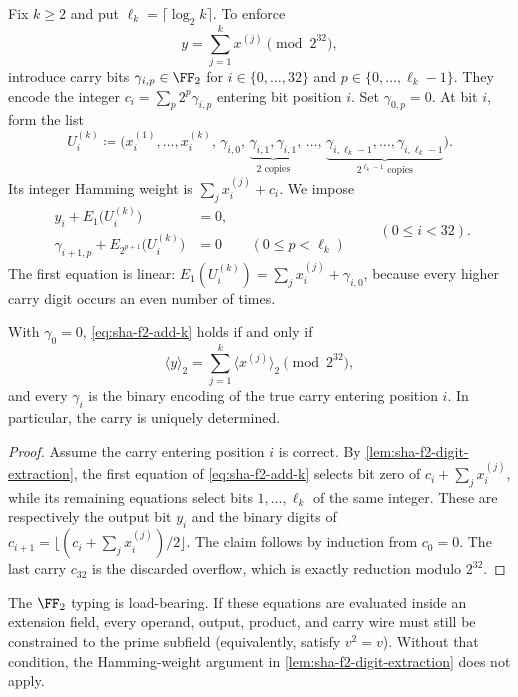Fix $k\geq2$ and put $\ell_k=\lceil\log_2 k\rceil$.  To enforce
\[
  y=\sum_{j=1}^k x^{(j)}\pmod{2^{32}},
\]
introduce carry bits
$\gamma_{i,p}\in\FF_2$ for
$i\in\{0,\ldots,32\}$ and $p\in\{0,\ldots,\ell_k-1\}$.
They encode the integer
$c_i=\sum_p2^p\gamma_{i,p}$ entering bit position $i$.  Set
$\gamma_{0,p}=0$.  At bit $i$, form the list
\begin{equation}\label{eq:sha-f2-carry-multiset}
  U_i^{(k)}
  \coloneqq
  \bigl(
    x^{(1)}_i,\ldots,x^{(k)}_i,\,
    \gamma_{i,0},\,
    \underbrace{\gamma_{i,1},\gamma_{i,1}}_{2\text{ copies}},\,
    \ldots,\,
    \underbrace{\gamma_{i,\ell_k-1},\ldots,
                \gamma_{i,\ell_k-1}}_{2^{\ell_k-1}\text{ copies}}
  \bigr).
\end{equation}
Its integer Hamming weight is
$\sum_jx_i^{(j)}+c_i$.  We impose
\begin{equation}\label{eq:sha-f2-add-k}
\boxed{
\begin{aligned}
 y_i+E_1\bigl(U_i^{(k)}\bigr)&=0,\\
 \gamma_{i+1,p}
   +E_{2^{p+1}}\bigl(U_i^{(k)}\bigr)&=0
       &&(0\leq p<\ell_k)
\end{aligned}}
\qquad(0\leq i<32).
\end{equation}
The first equation is linear:
$E_1(U_i^{(k)})=\sum_jx_i^{(j)}+\gamma_{i,0}$, because every
higher carry digit occurs an even number of times.

\begin{lemma}\label{lem:sha-f2-adder}
With $\gamma_0=0$, \eqref{eq:sha-f2-add-k} holds if and only if
\[
  \langle y\rangle_2
  =\sum_{j=1}^k\langle x^{(j)}\rangle_2\pmod{2^{32}},
\]
and every $\gamma_i$ is the binary encoding of the true carry entering
position $i$.  In particular, the carry is uniquely determined.
\end{lemma}
\begin{proof}
Assume the carry entering position $i$ is correct.  By
\cref{lem:sha-f2-digit-extraction}, the first equation of
\eqref{eq:sha-f2-add-k} selects bit zero of
$c_i+\sum_jx_i^{(j)}$, while its remaining equations select bits
$1,\ldots,\ell_k$ of the same integer.  These are respectively the output
bit $y_i$ and the binary digits of
$c_{i+1}=\lfloor(c_i+\sum_jx_i^{(j)})/2\rfloor$.
The claim follows by induction from $c_0=0$.  The last carry $c_{32}$ is the
discarded overflow, which is exactly reduction modulo $2^{32}$.
\end{proof}

The $\FF_2$ typing is load-bearing.  If these equations are evaluated inside
an extension field, every operand, output, product, and carry wire must still
be constrained to the prime subfield (equivalently, satisfy $v^2=v$).
Without that condition, the Hamming-weight argument in
\cref{lem:sha-f2-digit-extraction} does not apply.

